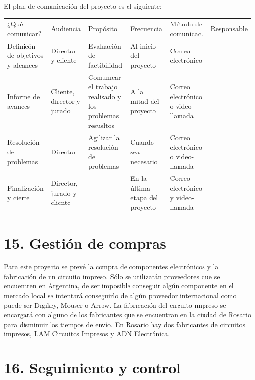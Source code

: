 \documentclass[11pt]{charter}
\begin{document}
El plan de comunicación del proyecto es el siguiente:

\begin{table}[htpb]
\centering
\begin{tabularx}{\linewidth}{@{}|X|C{2.4cm}|C{3cm}|C{1.8cm}|C{2cm}|C{2.1cm}|@{}}
\hline
{} 
           \\ \hline
{} 
¿Qué comunicar?					& Audiencia			& Propósito					& Frecuencia & Método de comunicac. & Responsable \\ \hline
Definicón de objetivos y alcances& Director y cliente	& Evaluación de factibilidad & Al inicio del proyecto & Correo electrónico & \authorname \\ \hline
Informe de avances				& Cliente, director y jurado & Comunicar el trabajo realizado y los problemas resueltos  & A la mitad del proyecto & Correo electrónico o video-llamada	& \authorname \\ \hline
Resolución de problemas			& Director          & Agilizar la resolución de problemas & Cuando sea necesario & Correo electrónico o video-llamada & \authorname	\\ \hline
Finalización y cierre			& Director, jurado y cliente &  & En la última etapa del proyecto & Correo electrónico y video-llamada & \authorname\\ \hline
\end{tabularx}
\end{table}

\section{15. Gestión de compras}
\label{sec:compras}

	Para este proyecto se prevé la compra de componentes electrónicos y la fabricación de un circuito impreso. Sólo se utilizarán proveedores que se encuentren en Argentina, de ser imposible conseguir algún componente en el mercado local se intentará conseguirlo de algún proveedor internacional como puede ser Digikey, Mouser o Arrow.
	La fabricación del circuito impreso se encargará con alguno de los fabricantes que se encuentran en la ciudad de Rosario para disminuir los tiempos de envío. En Rosario hay dos fabricantes de circuitos impresos, LAM Circuitos Impresos y ADN Electrónica.

\section{16. Seguimiento y control}
\label{sec:seguimiento}
\end{document}
